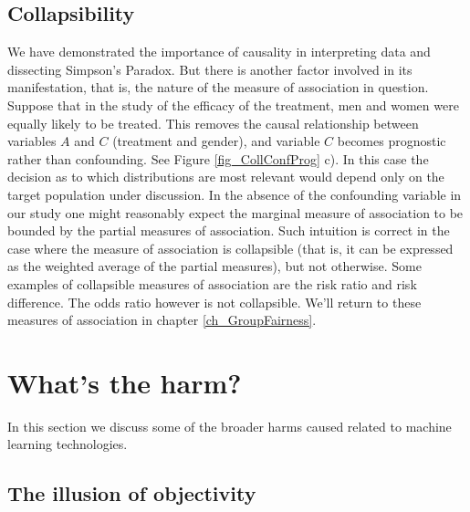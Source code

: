 \subsection{Collapsibility} \label{sec_collapsibility}

We have demonstrated the importance of causality in interpreting data and dissecting Simpson's Paradox. But there is another factor involved in its manifestation, that is, the nature of the measure of association in question. Suppose that in the study of the efficacy of the treatment, men and women were equally likely to be treated. This removes the causal relationship between variables $A$ and $C$ (treatment and gender), and variable $C$ becomes prognostic rather than confounding. See Figure \ref{fig_CollConfProg} c). In this case the decision as to which distributions are most relevant would depend only on the target population under discussion. In the absence of the confounding variable in our study one might reasonably expect the marginal measure of association to be bounded by the partial measures of association. Such intuition is correct in the case where the measure of association is collapsible (that is, it can be expressed as the weighted average of the partial measures), but not otherwise. Some examples of collapsible measures of association are the risk ratio and risk difference. The odds ratio however is not collapsible. We'll return to these measures of association in chapter \ref{ch_GroupFairness}.

\section{What's the harm?} \label{sec_harms}

In this section we discuss some of the broader harms caused related to machine learning technologies.

\subsection{The illusion of objectivity}

